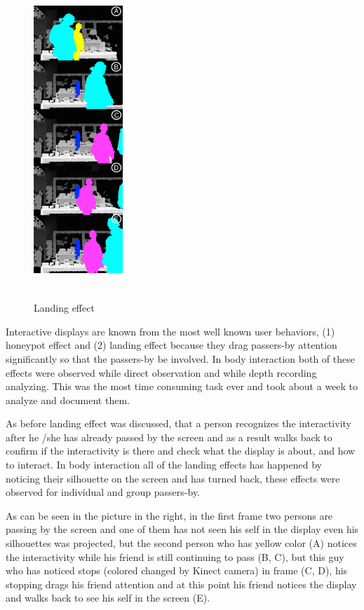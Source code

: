 \begin{figure}
  \vspace{-60pt}
  \begin{center}
    \includegraphics[width=0.3\textwidth,height=120mm]{figures/8/body_inter_findings/effects/landing}
  \end{center}
  \vspace{-20pt}
  \caption{Landing effect}
  \vspace{-10pt}
\end{figure}
Interactive displays are known from the most well known user behaviors, (1) honeypot effect and (2) landing effect because they drag passers-by attention significantly so that the passers-by be involved. In body interaction both of these effects were observed while direct observation and while depth recording analyzing. This was the most time consuming task ever and took about a week to analyze and document them.

As before landing effect was discussed, that a person recognizes the interactivity after he /she has already passed by the screen and as a result walks back to confirm if the interactivity is there and check what the display is about, and how to interact. In body interaction all of the landing effects has happened by noticing their silhouette on the screen and has turned back, these effects were observed for individual and group passers-by.

As can be seen in the picture in the right, in the first frame two persons are passing by the screen and one of them has not seen his self in the display even his silhouettes was projected, but the second person who has yellow color (A) notices the interactivity while his friend is still continuing to pass (B, C), but this guy who has noticed stops (colored changed by Kinect camera) in frame (C, D), his stopping drags his friend attention and at this point his friend notices the display and walks back to see his self in the screen (E).


